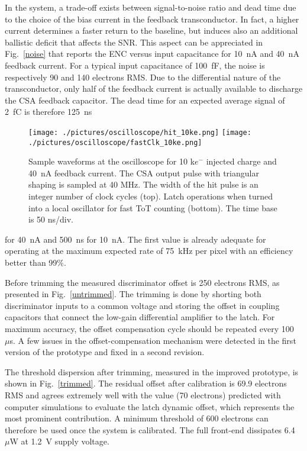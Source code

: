 \documentclass[conference]{./templates/IEEEtran/IEEEtran}
\begin{document}
In the system, a trade-off exists between signal-to-noise ratio and dead time due to the choice of the bias current in 
the feedback transconductor. In fact, a higher current determines a faster return to the baseline, but induces also an 
additional ballistic deficit that affects the SNR. This aspect can be appreciated in Fig.~\ref{noise} that reports the ENC 
versus input capacitance for 10~nA and 40~nA feedback current. For a typical input capacitance of 100~fF, the noise is 
respectively 90 and 140 electrons RMS. Due to the differential nature of the  transconductor, only half of the feedback 
current is actually available to discharge the CSA feedback capacitor. The dead time for an expected average signal of 
2~fC is therefore 125~ns


\begin{center}
\begin{figure}[!htpb]
\centering
\texttt{[image: ./pictures/oscilloscope/hit\_10ke.png]}
\texttt{[image: ./pictures/oscilloscope/fastClk\_10ke.png]}
\caption{Sample waveforms at the oscilloscope for 10 k$e^{-}$ injected charge and 40~nA feedback current. 
         The CSA output pulse with triangular shaping is sampled at 40 MHz. 
         The width of the hit pulse is an integer number of clock cycles (top).
         Latch operations when turned into a local oscillator for fast ToT counting (bottom). 
		 The time base is 50 ns/div.}
\label{oscilloscope}
\end{figure}
\end{center}



\noindent for 40~nA and 500~ns for 10~nA.  The first value is already adequate for operating at the maximum 
expected rate of 75~kHz per pixel with an efficiency better than 99\%.



Before trimming the measured discriminator offset is 250 electrons RMS, as presented in Fig.~\ref{untrimmed}.
The trimming is done by shorting both discriminator inputs to a common voltage and storing the offset in coupling 
capacitors that connect the low-gain differential amplifier to the latch. For maximum accuracy, the offset 
compensation cycle should be repeated every 100~$\mu$s. A few issues in the offset-compensation mechanism were 
detected in the first version of the prototype and fixed in a second revision. 

The threshold dispersion after trimming, measured in the improved prototype, is shown in Fig.~\ref{trimmed}. 
The residual offset after calibration is 69.9 electrons RMS and agrees extremely well with the value (70 electrons) 
predicted with computer simulations to evaluate the latch dynamic offset, which represents 
the most prominent contribution. A minimum threshold of 600 electrons can therefore be used once the system is calibrated.
The full front-end dissipates 6.4~$\mu$W at 1.2~V supply voltage.
\end{document}
